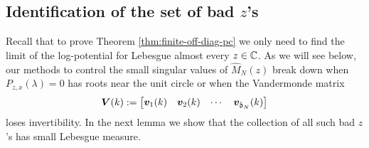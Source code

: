 \documentclass{amsart}
\numberwithin{equation}{section}
\def\corEE{\textcolor{amethyst}}
\def\corEE{}
\def\corABa{}
\begin{document}
\subsection*{Identification of the set of bad $z$'s}
Recall that to prove Theorem \ref{thm:finite-off-diag-pc} we only need to find the limit of the log-potential for Lebesgue almost every $z \in \mathbb{C}$.
\corEE{As we will see below, \corABa{our methods to control} the small singular values of $\hat{M}_N(z)$ break
down when $P_{z,x}(\lambda)=0$ has roots near the
unit circle or when the Vandermonde matrix
\begin{equation}
\label{eq:bmV}
{\bm V}(k):=\begin{bmatrix} {\bm v}_1(k) & {\bm v}_2(k) & \cdots & {\bm v}_{\hat{\mathfrak{d}}_N}(k) \end{bmatrix}
\end{equation}
loses invertibility.}
In the next lemma
we show that the collection of all such bad $z$'s has small Lebesgue measure.
\end{document}

